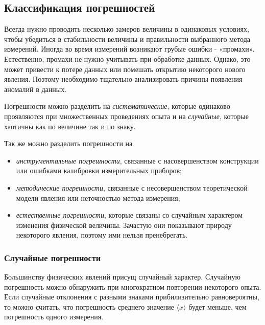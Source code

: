 \documentclass[12pt]{article}
\begin{document}
    \subsection{Классификация погрешностей}

      Всегда нужно проводить несколько замеров величины в одинаковых условиях, чтобы
      убедиться в стабильности величины и правильности выбранного метода измерений.
      Иногда во время измерений возникают грубые ошибки - «промахи». Естественно,
      промахи не нужно учитывать при обработке данных. Однако, это может привести
      к потере данных или помешать открытию некоторого нового явления. Поэтому необходимо
      тщательно анализировать причины появления аномалий в данных.

      Погрешности можно разделить на \textit{систематические}, которые одинаково
      проявляются при множественных проведениях опыта и на \textit{случайные}, которые
      хаотичны как по величине так и по знаку.

      Так же можно разделить погрешности на

      \begin{itemize}
        \item \textit{инструментальные погрешности}, связанные с насовершенством конструкции
        или ошибками калибровки измерительных приборов;

        \item \textit{методические погрешности}, связанные с несовершенством теоретической
        модели явления или неточностью метода измерения;

        \item \textit{естественные погрешности}, которые связаны со случайным характером
        изменения физической величины. Зачастую они показывают природу некоторого
        явления, поэтому ими нельзя пренебрегать.
      \end{itemize}

      \subsubsection{Случайные погрешности}

        Большинству физических явлений присущ случайный характер. Случайную погрешность
        можно обнаружить при многократном повторении некоторого опыта. Если случайные
        отклонения с разными знаками прибилизительно равновероятны, то можно считать, что
        погрешность среднего значение $\langle x \rangle$ будет меньше, чем погрешность
        одного измерения.
\end{document}
